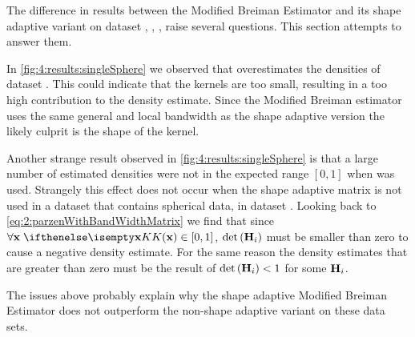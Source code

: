 
The difference in results between the Modified Breiman Estimator and its shape adaptive variant on dataset \ferdosiOne, \baakmanOne, \baakmanFour, \baakmanFive raise several questions. This section attempts to answer them.

	In \cref{fig:4:results:singleSphere} we observed that \sambe overestimates the densities of dataset \ferdosiOne. This could indicate that the kernels are too small, resulting in a too high contribution to the density estimate. Since the Modified Breiman estimator uses the same general and local bandwidth as the shape adaptive version the likely culprit is the shape of the kernel.

Another strange result observed in \cref{fig:4:results:singleSphere} is that a large number of estimated densities were not in the expected range $[0, 1]$ when \sambe was used. Strangely this effect does not occur when the shape adaptive matrix is not used in a dataset that contains spherical data, \ie in dataset \ferdosiOne. 
Looking back to \cref{eq:2:parzenWithBandWidthMatrix} we find that since $\forall \varPattern\; \varKernel{\varPattern} \in[0, 1]$, $\det\left(\varBandwidthMatrix[\itXis]\right)$ must be smaller than zero to cause a negative density estimate. For the same reason the density estimates that are greater than zero must be the result of $\det\left(\varBandwidthMatrix[\itXis]\right) < 1$ for some $\varBandwidthMatrix[\itXis]$.

The issues above probably explain why the shape adaptive Modified Breiman Estimator does not outperform the non-shape adaptive variant on these data sets.